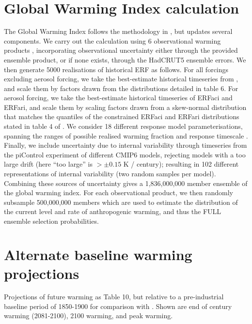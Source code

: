 \documentclass[gmd, manuscript]{copernicus}
\begin{document}
\section{Global Warming Index calculation}
The Global Warming Index follows the methodology in \cite{Haustein2016}, but updates several components. We carry out the calculation using 6 observational warming products \citep{Lenssen2019,Cowtan2014,Vose2012,Morice2011,Rohde2013,Morice2020}, incorporating observational uncertainty either through the provided ensemble product, or if none exists, through the HadCRUT5 ensemble errors. We then generate 5000 realisations of historical ERF as follows. For all forcings excluding aerosol forcing, we take the best-estimate historical timeseries from \cite{Smith2020c}, and scale them by factors drawn from the distributions detailed in table 6. For aerosol forcing, we take the best-estimate historical timeseries of ERFaci and ERFari, and scale them by scaling factors drawn from a skew-normal distribution that matches the quantiles of the constrained ERFaci and ERFari distributions stated in table 4 of \cite{Smith2020a}. We consider 18 different response model parameterisations, spanning the ranges of possible realised warming fraction \citep{Millar2015} and response timescale \citep{Geoffroy2013}. Finally, we include uncertainty due to internal variability through timeseries from the piControl experiment of different CMIP6 models, rejecting models with a too large drift (here ``too large'' is $>\pm0.15$ K / century); resulting in 102 different representations of internal variability (two random samples per model). Combining these sources of uncertainty gives a 1,836,000,000 member ensemble of the global warming index. For each observational product, we then randomly subsample 500,000,000 members which are used to estimate the distribution of the current level and rate of anthropogenic warming, and thus the FULL ensemble selection probabilities.
\clearpage
%
\section{Alternate baseline warming projections}
\begin{table}[h]
    \caption{Projections of future warming as Table 10, but relative to a pre-industrial baseline period of 1850-1900 for comparison with \citet{Tokarska2020a,Ribes2021}. Shown are end of century warming (2081-2100), 2100 warming, and peak warming.}
    \label{table:alt_proj}
    
\end{table}
\clearpage
%
\end{document}
